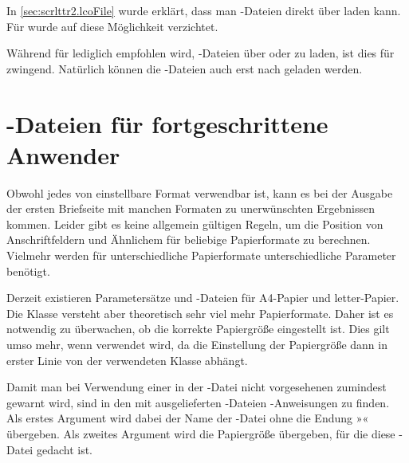 In \autoref{sec:scrlttr2.lcoFile} wurde
erklärt, dass man -Dateien direkt über  laden
kann. Für  wurde auf diese
Möglichkeit verzichtet.

\begin{Declaration}
\end{Declaration}
Während für  lediglich empfohlen wird, -Dateien über
 oder
 zu laden, ist dies für
 zwingend. Natürlich können die -Dateien auch
erst nach  geladen werden.
%
\EndIndexGroup
%
\EndIndexGroup
%
\fi


\section{-Dateien für fortgeschrittene Anwender}
\BeginIndexGroup
{}

\BeginIndexGroup%
%
Obwohl jedes von \hyperref[cha:typearea]{}%
 einstellbare Format verwendbar ist, kann es bei der
Ausgabe der ersten Briefseite mit manchen Formaten zu unerwünschten
Ergebnissen kommen. Leider gibt es
keine allgemein gültigen Regeln, um die Position von Anschriftfeldern und
Ähnlichem für beliebige Papierformate zu berechnen. Vielmehr werden für
unterschiedliche Papierformate unterschiedliche Parameter benötigt.%


Derzeit existieren Parametersätze und -Dateien für A4-Papier und
letter-Papier. Die Klasse  versteht aber theoretisch sehr viel
mehr Papierformate. Daher ist es notwendig zu überwachen, ob die korrekte
Papiergröße eingestellt ist. Dies gilt umso mehr, wenn 
verwendet wird, da die Einstellung der Papiergröße dann in erster Linie von
der verwendeten Klasse abhängt.

\begin{Declaration}
\end{Declaration}
Damit man bei Verwendung einer in der -Datei nicht vorgesehenen
 zumindest gewarnt wird, sind in den
mit \KOMAScript{} ausgelieferten -Dateien
-Anweisungen zu finden. Als erstes Argument
wird dabei der Name der -Datei ohne die Endung »«
übergeben. Als zweites Argument wird die Papiergröße übergeben, für die diese
-Datei gedacht ist.

